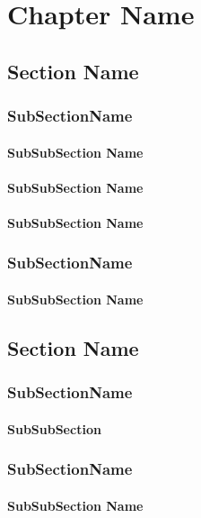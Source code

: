\chapter{Chapter Name}
\blindtext
\cite{stallman99:telepolis}
\section{Section Name}
\blindtext
\subsection{SubSectionName}
\blindtext
\subsubsection{SubSubSection Name}
\blindtext
\subsubsection{SubSubSection Name}
\blindtext
\subsubsection{SubSubSection Name}
\blindtext
\blindtext
\subsection{SubSectionName}
\blindtext
\subsubsection{SubSubSection Name}
\blindtext
\section{Section Name}
\blindtext
\subsection{SubSectionName}
\blindtext
\subsubsection{SubSubSection}
\blindtext
\subsection{SubSectionName}
\blindtext
\subsubsection{SubSubSection Name}
\blindtext
